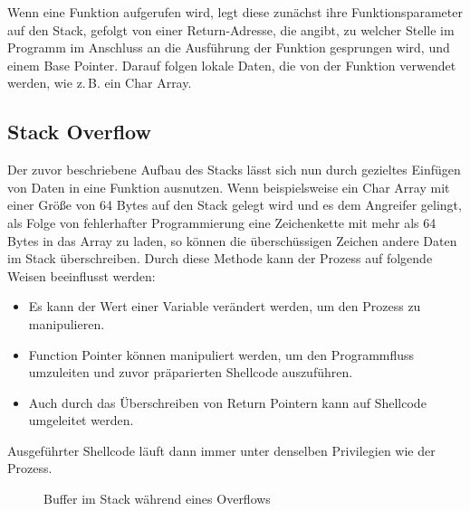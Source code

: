 Wenn eine Funktion aufgerufen wird, legt diese zunächst ihre Funktionsparameter auf den Stack,
gefolgt von einer Return-Adresse, die angibt, zu welcher Stelle im Programm im Anschluss an die
Ausführung der Funktion gesprungen wird, und einem Base Pointer. Darauf folgen lokale Daten,
die von der Funktion verwendet werden, wie z.\,B. ein Char Array. \cite{hamburg}
\pagebreak
\subsection{Stack Overflow}
Der zuvor beschriebene Aufbau des Stacks lässt sich nun durch gezieltes Einfügen von Daten in eine Funktion ausnutzen.
Wenn beispielsweise ein Char Array mit einer Größe von 64 Bytes auf den Stack gelegt wird und es dem Angreifer gelingt,
als Folge von fehlerhafter Programmierung eine Zeichenkette mit mehr als 64 Bytes in das Array zu laden, so können
die überschüssigen Zeichen andere Daten im Stack überschreiben. Durch diese Methode kann der Prozess auf folgende
Weisen beeinflusst werden:
\begin{itemize}
    \item Es kann der Wert einer Variable verändert werden, um den Prozess zu manipulieren.
    \item Function Pointer können manipuliert werden, um den Programmfluss umzuleiten und zuvor präparierten Shellcode auszuführen.
    \item Auch durch das Überschreiben von Return Pointern kann auf Shellcode umgeleitet werden.
\end{itemize}

Ausgeführter Shellcode läuft dann immer unter denselben Privilegien wie der Prozess. \cite{cloudflare} \cite{fortinet}
\begin{figure}[h]%
    \centering
    \qquad
    \caption{Buffer im Stack während eines Overflows}%
    \label{fig:example}%
\end{figure}

